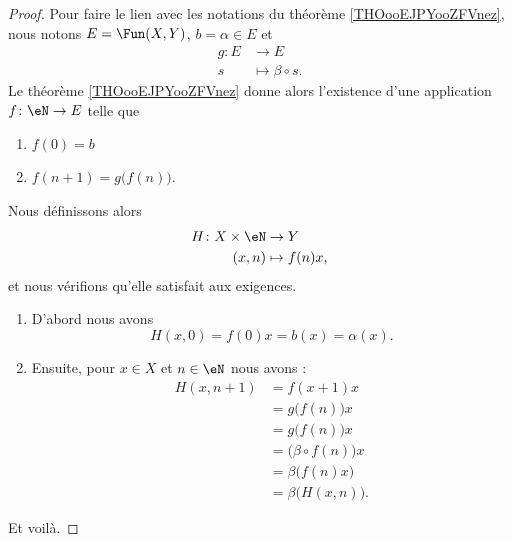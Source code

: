 \begin{proof}
	Pour faire le lien avec les notations du théorème \ref{THOooEJPYooZFVnez}, nous notons \( E=\Fun(X,Y)\), \( b=\alpha\in E\) et
	\begin{equation}
		\begin{aligned}
			g\colon E & \to E                 \\
			s         & \mapsto \beta\circ s.
		\end{aligned}
	\end{equation}
	Le théorème \ref{THOooEJPYooZFVnez} donne alors l'existence d'une application \( f\colon \eN\to E\) telle que
	\begin{enumerate}
		\item
		      \( f(0)=b\)
		\item
		      \( f(n+1)=g\big( f(n) \big)\).
	\end{enumerate}
	Nous définissons alors
	\begin{equation}
		\begin{aligned}
			H\colon X\times \eN & \to Y          \\
			(x,n)               & \mapsto f(n)x,
		\end{aligned}
	\end{equation}
	et nous vérifions qu'elle satisfait aux exigences.

	\begin{enumerate}
		\item
		      D'abord nous avons
		      \begin{equation}
			      H(x,0)=f(0)x=b(x)=\alpha(x).
		      \end{equation}
		\item
		      Ensuite, pour \( x\in X\) et \( n\in \eN\) nous avons :
		      \begin{subequations}
			      \begin{align}
				      H(x,n+1) & =f(x+1)x                      \\
				               & =g\big( f(n) \big)x           \\
				               & =g\big( f(n) \big)x           \\
				               & =\big( \beta\circ f(n) \big)x \\
				               & =\beta\big( f(n)x \big)       \\
				               & =\beta\big( H(x,n) \big).
			      \end{align}
		      \end{subequations}
	\end{enumerate}
	Et voilà.
\end{proof}

